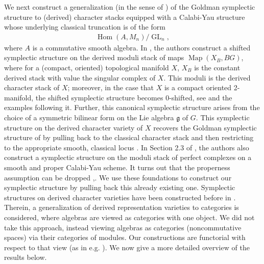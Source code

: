 \documentclass{article}
\numberwithin{equation}{section}
\theoremstyle{quest}
\theoremstyle{definition}
\theoremstyle{remark}
\DeclareMathOperator{\GL}{GL}
\DeclareMathOperator{\Hom}{Hom}
\DeclareMathOperator{\Map}{Map}
\begin{document}
We next construct a generalization (in the sense of \cite{PTVV}) of the Goldman symplectic structure to (derived) character stacks equipped with a Calabi-Yau structure whose underlying classical truncation is of the form
\begin{align*}
	\Hom(A,M_n) /\GL_n,
\end{align*} 
where $A$ is a commutative smooth algebra. In \cite{PTVV}, the authors construct a shifted symplectic structure on the derived moduli stack of maps $\Map(X_B,BG)$, where for a (compact, oriented) topological manifold $X$, $X_B$ is the constant derived stack with value the singular complex of $X$. This moduli is the derived character stack of $X$; moreover, in the case that $X$ is a compact oriented 2-manifold,  the shifted symplectic structure becomes 0-shifted, see \cite[Theorem 2.5]{PTVV} and the examples following it. Further, this canonical symplectic structure arises from the choice of a symmetric bilinear form on the Lie algebra $\mathfrak g$ of $G$. This symplectic structure on the derived character variety of $X$ recovers the Goldman symplectic structure of \cite{gold} by pulling back to the classical character stack and then restricting to the appropriate smooth, classical locus \cite{PTVV,safronov-goldman}. In Section 2.3 of \cite{PTVV}, the authors also construct a symplectic structure on the moduli stack of perfect complexes on a smooth and proper Calabi-Yau scheme. It turns out that the properness assumption can be dropped \cite{BD},\cite[Theorem D and Lemma 3.7]{BD-is-PTVV}. We use these foundations to construct our symplectic structure by pulling back this already existing one. Symplectic structures on derived character varieties have been constructed before in \cite{symplectic-structure}. Therein, a generalization of derived representation varieties to categories is considered, where algebras are viewed as categories with one object. We did not take this approach, instead viewing algebras as categories (noncommutative spaces) via their categories of modules. Our constructions are functorial with respect to that view (as in e.g. \cite{TV}). We now give a more detailed overview of the results below.
\end{document}

